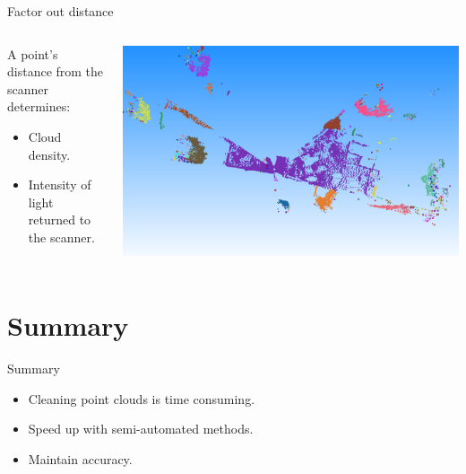 \documentclass{beamer}
\begin{document}
\begin{frame}{Factor out distance}

\begin{columns}[T]

\begin{column}{0.5\textwidth}

A point's distance from the scanner determines:
\begin{itemize}
\item Cloud density.
\item Intensity of light returned to the scanner.
\end{itemize}

\end{column}

\begin{column}{0.5\textwidth}

\includegraphics[width=1\textwidth]{pics/clustering.png}

\end{column}

\end{columns}



  
\end{frame}

\section*{Summary}

\begin{frame}{Summary}

  \begin{itemize}
  \item
    Cleaning point clouds is time consuming.
  \item
    Speed up with semi-automated methods.
  \item
    Maintain accuracy.
  \end{itemize}
  
\end{frame}
\end{document}
